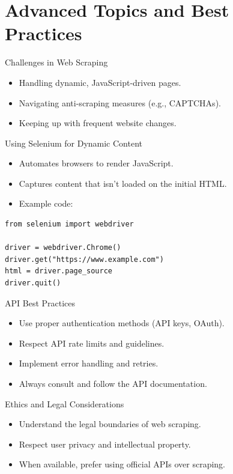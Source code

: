\documentclass[10pt]{beamer}
\begin{document}
\section{Advanced Topics and Best Practices}
\begin{frame}[fragile]{Challenges in Web Scraping}
    \begin{itemize}
        \item Handling dynamic, JavaScript-driven pages.
        \item Navigating anti-scraping measures (e.g., CAPTCHAs).
        \item Keeping up with frequent website changes.
    \end{itemize}
\end{frame}

\begin{frame}[fragile]{Using Selenium for Dynamic Content}
    \begin{itemize}
        \item Automates browsers to render JavaScript.
        \item Captures content that isn't loaded on the initial HTML.
        \item Example code:
    \end{itemize}
    \begin{verbatim}
from selenium import webdriver

driver = webdriver.Chrome()
driver.get("https://www.example.com")
html = driver.page_source
driver.quit()
    \end{verbatim}
\end{frame}

\begin{frame}[fragile]{API Best Practices}
    \begin{itemize}
        \item Use proper authentication methods (API keys, OAuth).
        \item Respect API rate limits and guidelines.
        \item Implement error handling and retries.
        \item Always consult and follow the API documentation.
    \end{itemize}
\end{frame}

\begin{frame}[fragile]{Ethics and Legal Considerations}
    \begin{itemize}
        \item Understand the legal boundaries of web scraping.
        \item Respect user privacy and intellectual property.
        \item When available, prefer using official APIs over scraping.
    \end{itemize}
\end{frame}
\end{document}
